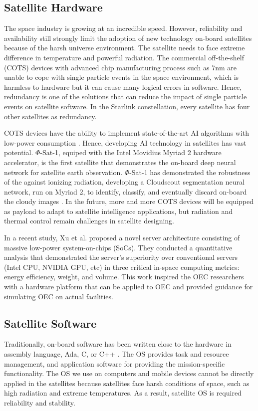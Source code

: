 \documentclass[lettersize,journal]{IEEEtran}
\begin{document}
\subsection{Satellite Hardware}
\label{sec2-a}

The space industry is growing at an incredible speed. However, reliability and availability still strongly limit the adoption of new technology on-board satellites because of the harsh universe environment. The satellite needs to face extreme difference in temperature and powerful radiation. The commercial off-the-shelf (COTS) devices with advanced chip manufacturing process such as 7nm are unable to cope with single particle events in the space environment, which is harmless to hardware but it can cause many logical errors in software. Hence, redundancy is one of the solutions that can reduce the impact of single particle events on satellite software. In the Starlink constellation, every satellite has four other satellites as redundancy.

COTS devices have the ability to implement state-of-the-art AI algorithms with low-power consumption \cite{RN229}.  Hence, developing AI technology in satellites has vast potential. $\Phi$-Sat-1, equiped with the Intel Movidius Myriad 2 hardware accelerator, is the first satellite that demonstrates the on-board deep neural network for satellite earth observation. $\Phi$-Sat-1 has demonstrated the robustness of the against ionizing radiation, developing a Cloudscout segmentation neural network, run on Myriad 2, to identify, classify, and eventually discard on-board the cloudy images \cite{RN230}. In the future, more and more COTS devices will be equipped as payload to adapt to satellite intelligence applications, but radiation and thermal control remain challenges in satellite designing.

In a recent study, Xu et al. \cite{RN260} proposed a novel server architecture consisting of massive low-power system-on-chips (SoCs). They conducted a quantitative analysis that demonstrated the server's superiority over conventional servers (Intel CPU, NVIDIA GPU, etc) in three critical in-space computing metrics: energy efficiency, weight, and volume. This work inspired the OEC researchers with a hardware platform that can be applied to OEC and provided guidance for simulating OEC on actual facilities.

\subsection{Satellite Software}
Traditionally, on-board software has been written close to the hardware in assembly language, Ada, C, or C++ \cite{sos1}. The OS provides task and resource management, and application software for providing the mission-specific functionality. The OS we use on computers and mobile devices cannot be directly applied in the satellites because satellites face harsh conditions of space, such as high radiation and extreme temperatures. As a result, satellite OS is required reliability and stability.
\end{document}
